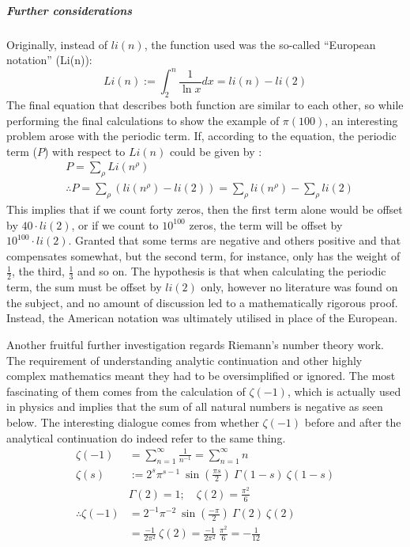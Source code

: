 \subparagraph{Further considerations}
Originally, instead of $li(n)$, the function used was the so-called ``European notation'' (Li(n)):
\begin{equation*}
	Li(n) := \int_{2}^{n}\frac{1}{\ln x} dx = li(n) - li(2)
\end{equation*}
The final equation that describes both function are similar to each other, so while performing the final calculations to show the example of $\pi(100)$, an interesting problem arose with the periodic term. If, according to the equation, the periodic term ($P$) with respect to $Li(n)$ could be given by \citep{Grime2014Youtube}:
\begin{equation*}
\begin{split}
	&P = \sum_{\rho} Li(n^{\rho}) \\
	&\therefore P = \sum_{\rho} (li(n^\rho) - li(2)) = \sum_{\rho} li(n^\rho) - \sum_{\rho} li(2)
\end{split}
\end{equation*}
This implies that if we count forty zeros, then the first term alone would be offset by $40\cdot li(2)$, or if we count to $10^{100}$ zeros, the term will be offset by $10^{100} \cdot li(2)$. Granted that some terms are negative and others positive and that compensates somewhat, but the second term, for instance, only has the weight of $ \frac{1}{2} $, the third, $ \frac{1}{3} $ and so on. The hypothesis is that when calculating the periodic term, the sum must be offset by $ li(2) $ only, however no literature was found on the subject, and no amount of discussion led to a mathematically rigorous proof. Instead, the American notation was ultimately utilised in place of the European.

Another fruitful further investigation regards Riemann's number theory work. The requirement of understanding analytic continuation and other highly complex mathematics meant they had to be oversimplified or ignored. The most fascinating of them comes from the calculation of $\zeta(-1)$, which is actually used in physics and implies that the sum of all natural numbers is negative as seen below. The interesting dialogue comes from whether $\zeta(-1)$ before and after the analytical continuation do indeed refer to the same thing.
\begin{equation*}
\begin{split}
\zeta(-1) &= \sum_{n=1}^{\infty} \frac{1}{n^{-1}} = \sum_{n=1}^{\infty}n \\
\zeta(s) &:= 2^s\pi^{s-1}\ \sin\left(\frac{\pi s}{2}\right)\ \Gamma(1-s)\ \zeta(1-s) \\
&\Gamma(2) = 1; \quad \zeta(2) = \frac{\pi^2}{6}\\
\therefore \zeta(-1) &= 2^{-1}\pi^{-2}\ \sin\left(\frac{-\pi}{2}\right)\ \Gamma(2)\ \zeta(2) \\
&= \frac{-1}{2\pi^2}\ \zeta(2) = \frac{-1}{2\pi^2}\ \frac{\pi^2}{6} = -\frac{1}{12}
\end{split}
\end{equation*}
